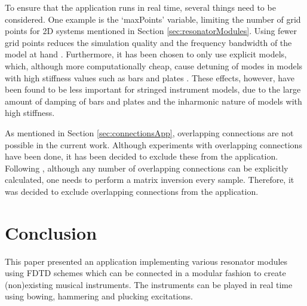 \documentclass{article}
\def\SWcomment[#1]{\textcolor{blue}{#1}}
\begin{document}

To ensure that the application runs in real time, several things need to be considered. One example is the `maxPoints' variable, limiting the number of grid points for 2D systems mentioned in Section \ref{sec:resonatorModules}. Using fewer grid points reduces the simulation quality and the frequency bandwidth of the model at hand \cite{theBible}. Furthermore, it has been chosen to only use explicit models, which, although more computationally cheap, cause detuning of modes in models with high stiffness values such as bars and plates \cite{theBible}. These effects, however, have been found to be less important for stringed instrument models, due to the large amount of damping of bars and plates and the inharmonic nature of models with high stiffness. 

As mentioned in Section \ref{sec:connectionsApp}, overlapping connections are not possible in the current work. Although experiments with overlapping connections have been done, it has been decided to exclude these from the application. Following \cite{Bilbao2009Modular}, although any number of overlapping connections can be explicitly calculated, one needs to perform a matrix inversion every sample. Therefore, it was decided to exclude overlapping connections from the application. 



\section{Conclusion}\label{sec:conclusion}
This paper presented an application implementing various resonator modules using FDTD schemes which can be connected in a modular fashion to create (non)existing musical instruments. The instruments can be played in real time using bowing, hammering and plucking excitations.
\end{document}
